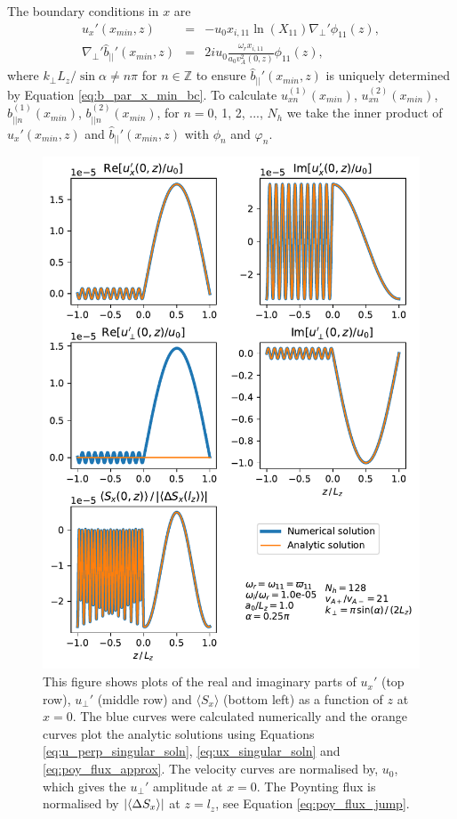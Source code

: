 \documentclass[linenumbers]{aastex63}
\begin{document}
The boundary conditions in $x$ are
\begin{eqnarray}
    \label{eq:ux_x_min_bc}
    u_x'(x_{min},z) & = & -u_0x_{i,11}\ln(X_{11})\nabla_\perp'\phi_{11}(z), \\
    \label{eq:b_par_x_min_bc}
    \nabla_\perp' \hat{b}_{||}'(x_{min},z) & = &2iu_0\frac{\omega_r x_{i,11}}{a_0v_A^2(0,z)}\phi_{11}(z),
\end{eqnarray}
where $k_\perp L_z / \sin\alpha \ne n\pi$ for $n\in\mathds{Z}$ to ensure $\hat{b}_{||}'(x_{min},z)$ is uniquely determined by Equation \eqref{eq:b_par_x_min_bc}.
To calculate $u_{xn}^{(1)}(x_{min})$, $u_{xn}^{(2)}(x_{min})$, $b_{||n}^{(1)}(x_{min})$, $b_{||n}^{(2)}(x_{min})$, for $n=0$, 1, 2, ..., $N_h$ we take the inner product of $u_x'(x_{min},z)$ and $\hat{b}_{||}'(x_{min},z)$ with $\phi_n$ and $\varphi_n$.

\begin{figure}
    \centering
    \includegraphics[width=17cm,height=0.91\textheight,keepaspectratio]{along_z.pdf}
    \caption{This figure shows plots of the real and imaginary parts of $u_x'$ (top row), $u_\perp'$ (middle row) and $\langle S_x \rangle$ (bottom left) as a function of $z$ at $x=0$. The blue curves were calculated numerically and the orange curves plot the analytic solutions using Equations \eqref{eq:u_perp_singular_soln}, \eqref{eq:ux_singular_soln} and \eqref{eq:poy_flux_approx}. The velocity curves are normalised by, $u_0$, which gives the $u_\perp'$ amplitude at $x=0$. The Poynting flux is normalised by $\abs{\langle \Delta S_x \rangle}$ at $z=l_z$, see Equation \eqref{eq:poy_flux_jump}.}
    \label{fig:along_z}
\end{figure}
\end{document}
